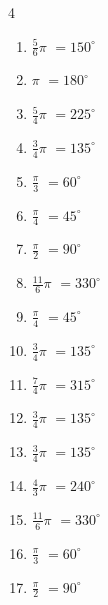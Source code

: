 \begin{multicols}{4}
\begin{enumerate}
  \item $\displaystyle \frac{5}{6}\pi$
        $\displaystyle =150^{\circ}$

  \item $\displaystyle \pi$
        $\displaystyle =180^{\circ}$

  \item $\displaystyle \frac{5}{4}\pi$
        $\displaystyle =225^{\circ}$

  \item $\displaystyle \frac{3}{4}\pi$
        $\displaystyle =135^{\circ}$

  \item $\displaystyle \frac{\pi}{3}$
        $\displaystyle =60^{\circ}$

  \item $\displaystyle \frac{\pi}{4}$
        $\displaystyle =45^{\circ}$

  \item $\displaystyle \frac{\pi}{2}$
        $\displaystyle =90^{\circ}$

  \item $\displaystyle \frac{11}{6}\pi$
        $\displaystyle =330^{\circ}$

  \item $\displaystyle \frac{\pi}{4}$
        $\displaystyle =45^{\circ}$

  \item $\displaystyle \frac{3}{4}\pi$
        $\displaystyle =135^{\circ}$

  \item $\displaystyle \frac{7}{4}\pi$
        $\displaystyle =315^{\circ}$

  \item $\displaystyle \frac{3}{4}\pi$
        $\displaystyle =135^{\circ}$

  \item $\displaystyle \frac{3}{4}\pi$
        $\displaystyle =135^{\circ}$

  \item $\displaystyle \frac{4}{3}\pi$
        $\displaystyle =240^{\circ}$

  \item $\displaystyle \frac{11}{6}\pi$
        $\displaystyle =330^{\circ}$

  \item $\displaystyle \frac{\pi}{3}$
        $\displaystyle =60^{\circ}$

  \item $\displaystyle \frac{\pi}{2}$
        $\displaystyle =90^{\circ}$


\end{enumerate}
\end{multicols}
